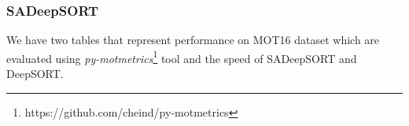 \subsubsection{SADeepSORT}
\hspace{0.45cm}We have two tables that represent performance on MOT16 dataset which are evaluated using \textit{py-motmetrics}\footnote{https://github.com/cheind/py-motmetrics} tool and the speed of SADeepSORT and DeepSORT\cite{Wojke2017simple}. 

